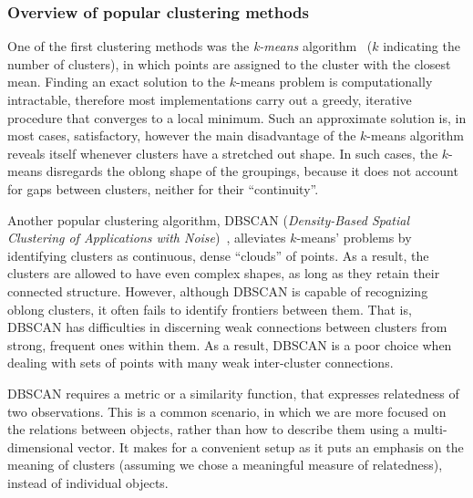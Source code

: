 \documentclass[a4paper,11pt,twoside]{book}%
\begin{document}
\subsubsection{Overview of popular clustering methods}

One of the first clustering methods was the \emph{k-means} algorithm~\cite{macqueen1967some} ($k$ indicating the number of clusters), in which points are assigned to the cluster with the closest mean.
Finding an exact solution to the $k$-means problem is computationally intractable, therefore most implementations carry out a greedy, iterative procedure that converges to a local minimum.
Such an approximate solution is, in most cases, satisfactory, however the main disadvantage of the $k$-means algorithm reveals itself whenever clusters have a stretched out shape.
In such cases, the $k$-means disregards the oblong shape of the groupings, because it does not account for gaps between clusters, neither for their ``continuity''.

Another popular clustering algorithm, DBSCAN (\emph{Density-Based Spatial Clustering of Applications with Noise})~\cite{ester1996density}, alleviates $k$-means' problems by identifying clusters as continuous, dense ``clouds'' of points.
As a result, the clusters are allowed to have even complex shapes, as long as they retain their connected structure.
However, although DBSCAN is capable of recognizing oblong clusters, it often fails to identify frontiers between them.
That is, DBSCAN has difficulties in discerning weak connections between clusters from strong, frequent ones within them.
As a result, DBSCAN is a poor choice when dealing with sets of points with many weak inter-cluster connections.

DBSCAN requires a metric or a similarity function, that expresses relatedness of two observations.
This is a common scenario, in which we are more focused on the relations between objects, rather than how to describe them using a multi-dimensional vector.
It makes for a convenient setup as it puts an emphasis on the meaning of clusters (assuming we chose a meaningful measure of relatedness), instead of individual objects.
\end{document}
